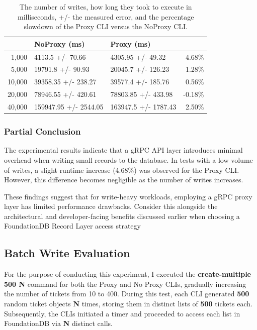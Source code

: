 \documentclass[sigconf]{acmart}
\begin{document}
\begin{table}[h]
\begin{tabular}{|r|l|l|r|}
    \hline
    \rowcolor[HTML]{656565} 
    \multicolumn{1}{|l|}{\cellcolor[HTML]{656565}{\color[HTML]{FFFFFF} \textbf{Writes}}} &
        {\color[HTML]{FFFFFF} \textbf{NoProxy (ms)}} &
        {\color[HTML]{FFFFFF} \textbf{Proxy (ms)}} &
        \multicolumn{1}{l|}{\cellcolor[HTML]{656565}{\color[HTML]{FFFFFF} \textbf{Slowdown}}} \\ \hline
    1,000  & 4113.5 +/- 70.66      & 4305.95 +/- 49.32    & 4.68\%  \\
    \rowcolor[HTML]{EFEFEF} 
    5,000  & 19791.8 +/- 90.93     & 20045.7 +/- 126.23   & 1.28\%  \\
    10,000 & 39358.35 +/- 238.27   & 39577.4 +/- 185.76   & 0.56\%  \\
    \rowcolor[HTML]{EFEFEF} 
    20,000 & 78946.55 +/- 420.61   & 78803.85 +/- 433.98  & -0.18\% \\
    40,000 & 159947.95 +/- 2544.05 & 163947.5 +/- 1787.43 & 2.50\% \\ \hline
\end{tabular}
\caption{The number of writes, how long they took to execute in milliseconds, +/- the measured error, and the percentage slowdown of the Proxy CLI versus the NoProxy CLI.}
\end{table}

\subsubsection{Partial Conclusion}

The experimental results indicate that a gRPC API layer introduces minimal overhead when writing small records to the database. In tests with a low volume of writes, a slight runtime increase (4.68\%) was observed for the Proxy CLI. However, this difference becomes negligible as the number of writes increases.

These findings suggest that for write-heavy workloads, employing a gRPC proxy layer has limited performance drawbacks. Consider this alongside the architectural and developer-facing benefits discussed earlier when choosing a FoundationDB Record Layer access strategy

\subsection{Batch Write Evaluation}

For the purpose of conducting this experiment, I executed the \textbf{create-multiple 500 N} command for both the Proxy and No Proxy CLIs, gradually increasing the number of tickets from 10 to 400. During this test, each CLI generated \textbf{500} random ticket objects \textbf{N} times, storing them in distinct lists of \textbf{500} tickets each. Subsequently, the CLIs initiated a timer and proceeded to access each list in FoundationDB via \textbf{N} distinct calls.
\end{document}
